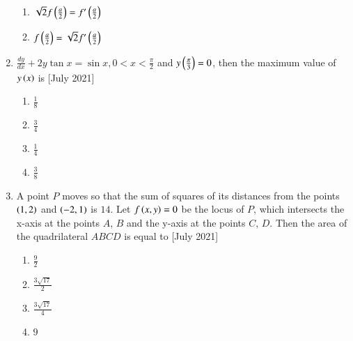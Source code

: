 \documentclass[journal]{IEEEtran}
\begin{document}
\begin{enumerate}
\begin{multicols}{2}
\begin{enumerate}
                \item $\sqrt{2}f\left(\frac{a}{2}\right) = f^{\prime}\left(\frac{a}{2}\right)$
                \item $f\left(\frac{a}{2}\right) = \sqrt{2}f^{\prime}\left(\frac{a}{2}\right)$
            \end{enumerate}
        \end{multicols}
        \item $\frac{dy}{dx} + 2y \tan x = \sin x, 0<x<\frac{\pi}{2}$ and $y\left(\frac{\pi}{3}\right) = 0$, then the maximum value of $y\left(x\right)$ is \hfill{[July 2021]}
        \begin{multicols}{2}
            \begin{enumerate}
                \item $\frac{1}{8}$
                \item $\frac{3}{4}$
                \item $\frac{1}{4}$
                \item $\frac{3}{8}$
            \end{enumerate}
        \end{multicols}

        \item A point $P$ moves so that the sum of squares of its distances from the points $\left(1,2\right)$ and $\left(-2,1\right)$ is $14$. Let $f\left(x,y\right) = 0$ be the locus of $P$, which intersects the x-axis at the points $A$, $B$ and the y-axis at the points $C$, $D$. Then the area of the quadrilateral $ABCD$ is equal to \hfill{[July 2021]}
        \begin{multicols}{2}
            \begin{enumerate}
                \item $\frac{9}{2}$
                \item $\frac{3\sqrt{17}}{2}$
                \item $\frac{3\sqrt{17}}{4}$
                \item $9$
                

\end{enumerate}
\end{multicols}
\end{enumerate}
\end{document}
